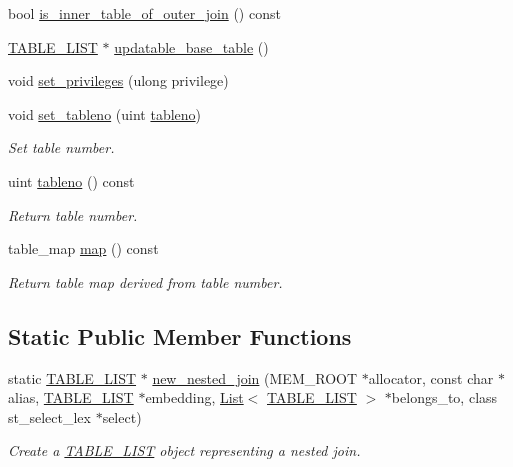 \begin{DoxyCompactItemize}
bool \mbox{\hyperlink{structTABLE__LIST_a644a278cc3ca2f3d85f5ca1ce8187878}{is\+\_\+inner\+\_\+table\+\_\+of\+\_\+outer\+\_\+join}} () const
\item 
\mbox{\hyperlink{structTABLE__LIST}{T\+A\+B\+L\+E\+\_\+\+L\+I\+ST}} $\ast$ \mbox{\hyperlink{structTABLE__LIST_a3368e5b0a9c43522662435379e71acc7}{updatable\+\_\+base\+\_\+table}} ()
\item 
void \mbox{\hyperlink{structTABLE__LIST_a0c04ee29c14e9bab9408150cc6539fce}{set\+\_\+privileges}} (ulong privilege)
\item 
\mbox{\label{structTABLE__LIST_ae93ef5cdd9299bf9fa2b1197b9f0e495}} 
void \mbox{\hyperlink{structTABLE__LIST_ae93ef5cdd9299bf9fa2b1197b9f0e495}{set\+\_\+tableno}} (uint \mbox{\hyperlink{structTABLE__LIST_a9250ae0db9e0788ce6af28dba3bc631f}{tableno}})
\begin{DoxyCompactList}\small\item\em Set table number. \end{DoxyCompactList}\item 
\mbox{\label{structTABLE__LIST_a9250ae0db9e0788ce6af28dba3bc631f}} 
uint \mbox{\hyperlink{structTABLE__LIST_a9250ae0db9e0788ce6af28dba3bc631f}{tableno}} () const
\begin{DoxyCompactList}\small\item\em Return table number. \end{DoxyCompactList}\item 
\mbox{\label{structTABLE__LIST_a24a1eac5a4be4ed7407792e12795191b}} 
table\+\_\+map \mbox{\hyperlink{structTABLE__LIST_a24a1eac5a4be4ed7407792e12795191b}{map}} () const
\begin{DoxyCompactList}\small\item\em Return table map derived from table number. \end{DoxyCompactList}\end{DoxyCompactItemize}
\subsection*{Static Public Member Functions}
\begin{DoxyCompactItemize}
\item 
static \mbox{\hyperlink{structTABLE__LIST}{T\+A\+B\+L\+E\+\_\+\+L\+I\+ST}} $\ast$ \mbox{\hyperlink{structTABLE__LIST_a0410916850db388be734dad75e4dcb8a}{new\+\_\+nested\+\_\+join}} (M\+E\+M\+\_\+\+R\+O\+OT $\ast$allocator, const char $\ast$alias, \mbox{\hyperlink{structTABLE__LIST}{T\+A\+B\+L\+E\+\_\+\+L\+I\+ST}} $\ast$embedding, \mbox{\hyperlink{classList}{List}}$<$ \mbox{\hyperlink{structTABLE__LIST}{T\+A\+B\+L\+E\+\_\+\+L\+I\+ST}} $>$ $\ast$belongs\+\_\+to, class st\+\_\+select\+\_\+lex $\ast$select)
\begin{DoxyCompactList}\small\item\em Create a \mbox{\hyperlink{structTABLE__LIST}{T\+A\+B\+L\+E\+\_\+\+L\+I\+ST}} object representing a nested join. \end{DoxyCompactList}\end{DoxyCompactItemize}
